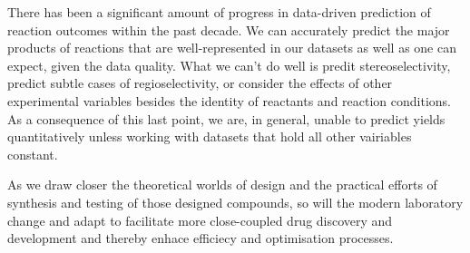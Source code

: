 There has been a significant amount of progress in data-driven prediction of reaction outcomes within the past decade. We can accurately predict the major products of reactions that are well-represented in our datasets as well as one can expect, given the data quality. What we can't do well is predit stereoselectivity, predict subtle cases of regioselectivity, or consider the effects of other experimental variables besides the identity of reactants and reaction conditions. As a consequence of this last point, we are, in general, unable to predict yields quantitatively unless working with datasets that hold all other vairiables constant. 

As we draw closer the theoretical worlds of design and the practical efforts of synthesis and testing of those designed compounds, so will the modern laboratory change and adapt to facilitate more close-coupled drug discovery and development and thereby enhace efficiecy and optimisation processes.


